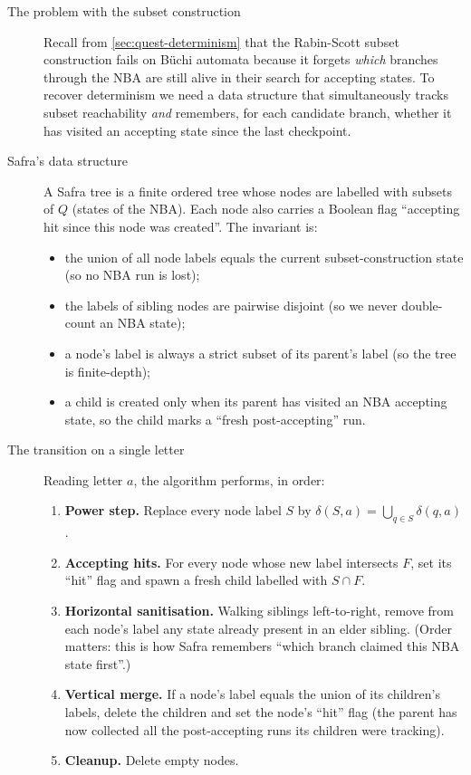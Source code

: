 \begin{formaldetails}
\begin{description}
    \item[The problem with the subset construction] Recall from \cref{sec:quest-determinism} that the Rabin-Scott subset construction fails on Büchi automata because it forgets \emph{which} branches through the NBA are still alive in their search for accepting states. To recover determinism we need a data structure that simultaneously tracks subset reachability \emph{and} remembers, for each candidate branch, whether it has visited an accepting state since the last checkpoint.

    \item[Safra's data structure] A Safra tree is a finite ordered tree whose nodes are labelled with subsets of $Q$ (states of the NBA). Each node also carries a Boolean flag ``accepting hit since this node was created''. The invariant is:
\begin{itemize}
\item the union of all node labels equals the current subset-construction state (so no NBA run is lost);
\item the labels of sibling nodes are pairwise disjoint (so we never double-count an NBA state);
\item a node's label is always a strict subset of its parent's label (so the tree is finite-depth);
\item a child is created only when its parent has visited an NBA accepting state, so the child marks a ``fresh post-accepting'' run.
\end{itemize}

    \item[The transition on a single letter] Reading letter $a$, the algorithm performs, in order:
\begin{enumerate}
\item \textbf{Power step.} Replace every node label $S$ by $\delta(S, a) = \bigcup_{q \in S} \delta(q, a)$.
\item \textbf{Accepting hits.} For every node whose new label intersects $F$, set its ``hit'' flag and spawn a fresh child labelled with $S \cap F$.
\item \textbf{Horizontal sanitisation.} Walking siblings left-to-right, remove from each node's label any state already present in an elder sibling. (Order matters: this is how Safra remembers ``which branch claimed this NBA state first''.)
\item \textbf{Vertical merge.} If a node's label equals the union of its children's labels, delete the children and set the node's ``hit'' flag (the parent has now collected all the post-accepting runs its children were tracking).
\item \textbf{Cleanup.} Delete empty nodes.
\end{enumerate}


\end{description}
\end{formaldetails}
